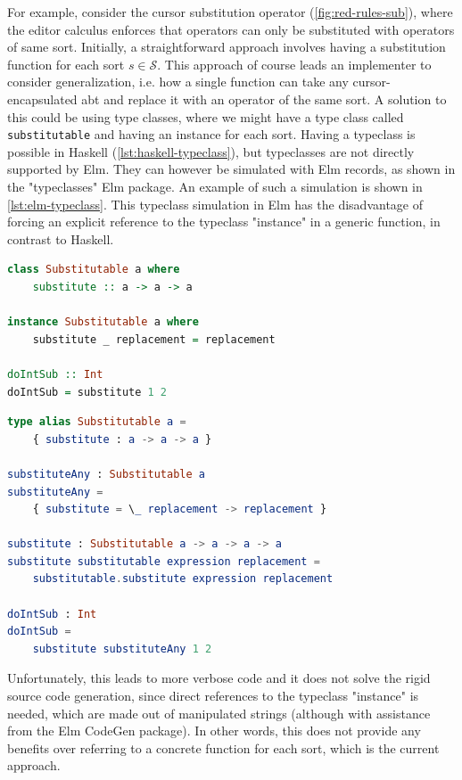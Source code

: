 For example, consider the cursor substitution operator (\cref{fig:red-rules-sub}),
where the editor calculus enforces that operators can only be substituted
with operators of same sort. Initially, a straightforward approach involves
having a substitution function for each sort $s \in \mathcal{S}$.
This approach of course leads an implementer to consider generalization,
i.e. how a single function can take any cursor-encapsulated abt and replace it
with an operator of the same sort. A solution to this could be
using type classes, where we might have a type class called \texttt{substitutable}
and having an instance for each sort.
Having a typeclass is possible in Haskell (\cref{lst:haskell-typeclass}),
but typeclasses are not directly supported by Elm.
They can however be simulated with Elm records, as shown in the "typeclasses"
Elm package\cite{elm-typeclass-package}.
An example of such a simulation is shown in \cref{lst:elm-typeclass}.
This typeclass simulation in Elm has the disadvantage of forcing an explicit
reference to the typeclass "instance" in a generic function, in contrast to Haskell.

\begin{lstlisting}[language=Haskell,style=inline,caption={Haskell typeclass example},label={lst:haskell-typeclass}]
class Substitutable a where 
    substitute :: a -> a -> a
    
instance Substitutable a where
    substitute _ replacement = replacement

doIntSub :: Int
doIntSub = substitute 1 2 
\end{lstlisting}


\begin{lstlisting}[language=elm,style=inline,caption={Elm typeclass simulation example},label={lst:elm-typeclass}]
type alias Substitutable a =
    { substitute : a -> a -> a }

substituteAny : Substitutable a
substituteAny =
    { substitute = \_ replacement -> replacement }

substitute : Substitutable a -> a -> a -> a
substitute substitutable expression replacement =
    substitutable.substitute expression replacement

doIntSub : Int
doIntSub =
    substitute substituteAny 1 2
\end{lstlisting}

Unfortunately, this leads to more verbose code and it does not solve the rigid source code generation, since direct references to the typeclass "instance" is needed, which are made out of manipulated strings (although with assistance from the Elm CodeGen package). In other words, this
does not provide any benefits over referring to a concrete function for
each sort, which is the current approach.